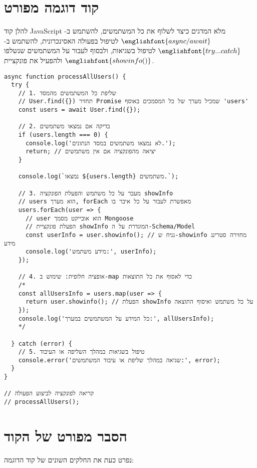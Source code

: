\documentclass[12pt]{article}
\begin{document}
\section{קוד דוגמה מפורט}

להלן קוד JavaScript מלא המדגים כיצד לשלוף את כל המשתמשים, להשתמש ב-\(\englishfont{async/await}\) לטיפול בפעולה האסינכרונית, להשתמש ב-\(\englishfont{try...catch}\) לטיפול בשגיאות, ולבסוף לעבור על המשתמשים שנשלפו ולהפעיל את פונקציית \(\englishfont{showinfo()}\).

\begin{tcolorbox}[title=קוד דוגמה: שליפת משתמשים והפעלת פונקציה ב-Mongoose]
  \begin{Verbatim}[lang=js]
async function processAllUsers() {
  try {
    // 1. שליפת כל המשתמשים מהמסד
    // User.find({}) תחזיר Promise שמכיל מערך של כל המסמכים באוסף 'users'
    const users = await User.find({});

    // 2. בדיקה אם נמצאו משתמשים
    if (users.length === 0) {
      console.log('לא נמצאו משתמשים במסד הנתונים.');
      return; // יציאה מהפונקציה אם אין משתמשים
    }

    console.log(`נמצאו ${users.length} משתמשים.`);

    // 3. מעבר על כל משתמש והפעלת הפונקציה showInfo
    // users הוא מערך, forEach מאפשרת לעבור על כל איבר בו
    users.forEach(user => {
      // user הוא אובייקט מסמך Mongoose
      // הפעלת פונקציית showInfo המוגדרת על ה-Schema/Model
      const userInfo = user.showinfo(); // נניח ש-showinfo מחזירה סטרינג מידע
      console.log('מידע משתמש:', userInfo);
    });

    // 4. אופציה חלופית: שימוש ב-map כדי לאסוף את כל התוצאות
    /*
    const allUsersInfo = users.map(user => {
      return user.showinfo(); // הפעלת showInfo על כל משתמש ואיסוף התוצאה
    });
    console.log('כל המידע על המשתמשים במערך:', allUsersInfo);
    */

  } catch (error) {
    // 5. טיפול בשגיאות במהלך השליפה או העיבוד
    console.error('שגיאה במהלך שליפת או עיבוד המשתמשים:', error);
  }
}

// קריאה לפונקציה לביצוע הפעולה
// processAllUsers();
  \end{Verbatim}
\end{tcolorbox}

\section{הסבר מפורט של הקוד}

נפרט כעת את החלקים השונים של קוד הדוגמה:
\end{document}
